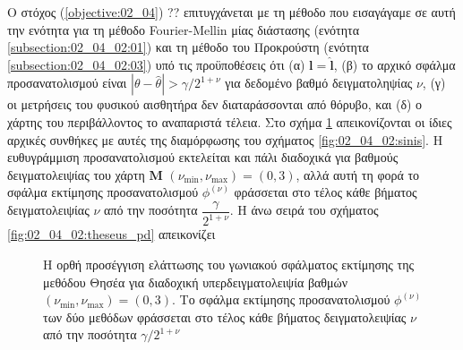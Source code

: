 Ο στόχος (\ref{objective:02_04}) ?? επιτυγχάνεται με τη μέθοδο που εισαγάγαμε σε
αυτή την ενότητα για τη μέθοδο Fourier-Mellin μίας διάστασης (ενότητα
\ref{subsection:02_04_02:01}) και τη μέθοδο του Προκρούστη (ενότητα
\ref{subsection:02_04_02:03}) υπό τις προϋποθέσεις ότι (α)
$\bm{l} = \hat{\bm{l}}$, (β) το αρχικό σφάλμα προσανατολισμού είναι
$|\theta - \hat{\theta}| > \gamma / 2^{1+\nu}$ για δεδομένο βαθμό
δειγματοληψίας $\nu$, (γ) οι μετρήσεις του φυσικού αισθητήρα δεν διαταράσσονται
από θόρυβο, και (δ) ο χάρτης του περιβάλλοντος το αναπαριστά τέλεια. Στο σχήμα
\ref{fig:02_04_02:theseus} απεικονίζονται οι ίδιες αρχικές συνθήκες με αυτές
της διαμόρφωσης του σχήματος \ref{fig:02_04_02:sinis}. Η ευθυγράμμιση
προσανατολισμού εκτελείται και πάλι διαδοχικά για βαθμούς δειγματολειψίας του
χάρτη $\bm{M}$ $(\nu_{\min}, \nu_{\max}) = (0,3)$, αλλά αυτή τη φορά το σφάλμα
εκτίμησης προσανατολισμού $\phi^{(\nu)}$ φράσσεται στο τέλος κάθε βήματος
δειγματολειψίας $\nu$ από την ποσότητα $\dfrac{\gamma}{2^{1+\nu}}$. Η άνω σειρά
του σχήματος \ref{fig:02_04_02:theseus_pd} απεικονίζει




\begin{figure}\centering
  \vspace{1.0cm}
  
  \vspace{0.5cm}
  \caption{\small Η ορθή προσέγγιση ελάττωσης του γωνιακού σφάλματος εκτίμησης
           της μεθόδου Θησέα για διαδοχική υπερδειγματολειψία βαθμών
           $(\nu_{\min}, \nu_{\max}) = (0,3)$. Το σφάλμα εκτίμησης
           προσανατολισμού $\phi^{(\nu)}$ των δύο μεθόδων φράσσεται στο τέλος
           κάθε βήματος δειγματολειψίας $\nu$ από την ποσότητα
           $\gamma/2^{1+\nu}$}
  \label{fig:02_04_02:theseus}
\end{figure}

